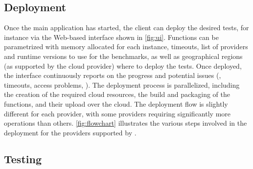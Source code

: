 \subsection{Deployment}

Once the main application has started, the client can deploy the desired tests, for instance via the Web-based interface shown in \autoref{fig:ui}.
Functions can be parametrized with memory allocated for each instance, timeouts, list of providers and runtime versions to use for the benchmarks, as well as geographical regions (as supported by the cloud provider) where to deploy the tests. 
Once deployed, the interface continuously reports on the progress and potential issues (\eg, timeouts, access problems, \etc). 
The deployment process is parallelized, including the creation of the required cloud resources, the build and packaging of the functions, and their upload over the cloud.
The deployment flow is slightly different for each provider, with some providers requiring significantly more operations than others.
\autoref{fig:flowchart} illustrates the various steps involved in the deployment for the providers supported by \sys.

\subsection{Testing}

